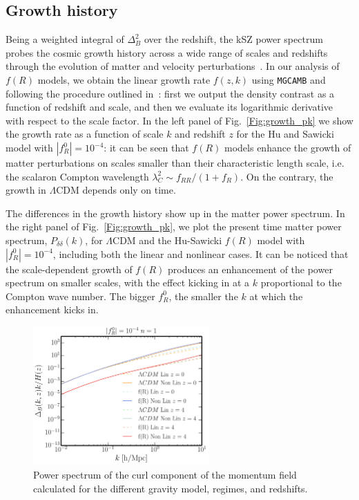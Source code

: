 \subsection{Growth history}
Being a weighted integral of $\Delta^2_B$ over the redshift, the kSZ power spectrum probes the cosmic growth history across a wide range of scales and redshifts through the evolution of matter and velocity perturbations~\cite{Shaw2012}. In our analysis of $f(R)$ models, we obtain the linear growth rate $f(z,k)$ using \texttt{MGCAMB} and following the procedure outlined in~\cite{Ma2014a}: first we output the density contrast as a function of redshift and scale, and then we evaluate its logarithmic derivative with respect to the scale factor. In the left panel of Fig.~\eqref{Fig:growth_pk} we show the growth rate as a function of scale $k$ and redshift $z$ for the Hu and Sawicki model with $|f^0_R|=10^{-4}$: it  can be seen that $f(R)$ models  enhance the growth of matter perturbations on scales smaller than their characteristic length scale, i.e. the scalaron Compton wavelength $\lambda^2_C \sim f_{RR}/(1+f_R)$. On the contrary, the growth in $\Lambda$CDM depends only on time. 

The differences in the growth history show up in the matter power spectrum. In the right panel of Fig.~\eqref{Fig:growth_pk}, we plot the present time matter power spectrum, $P_{\delta\delta}(k)$, for $\Lambda$CDM and the Hu-Sawicki $f(R)$ model with $|f^0_R|=10^{-4}$, including both the linear and nonlinear cases. It can be noticed that the scale-dependent growth of $f(R)$ produces an enhancement of the power spectrum on smaller scales, with the effect kicking in at a $k$ proportional to the Compton wave number. The bigger $f^0_R$, the smaller the $k$ at which the enhancement kicks in.

\begin{figure}[th]
\begin{center}
\includegraphics[width=0.6\textwidth]{Chapter6/Images/delta_b_h_z0_z4_fR0_4_n_1}
\caption{Power spectrum of the curl component of the momentum field calculated for the different gravity model, regimes, and redshifts. }
\label{Fig:Delta_b}
\end{center}
\end{figure}

